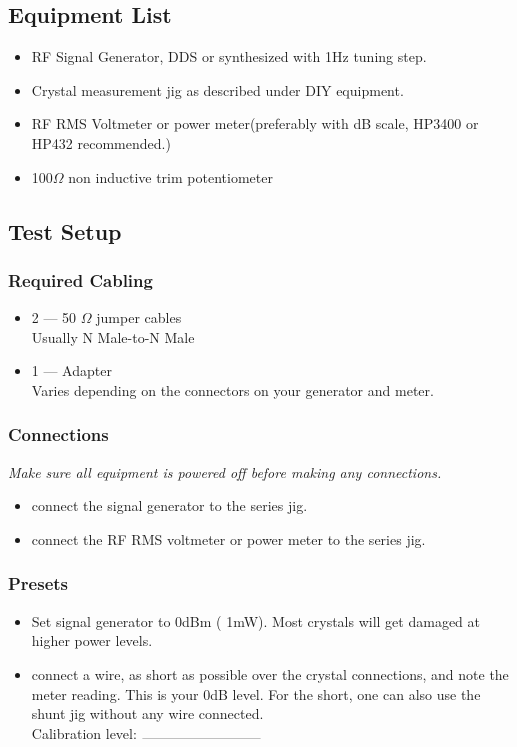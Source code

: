 \documentclass[10pt,letterpaper]{book}
\begin{document}
\subsection*{Equipment List}
\begin{itemize}
	\item RF Signal Generator, DDS or synthesized with 1Hz tuning step.
	\item Crystal measurement jig as described under DIY equipment.
	\item RF RMS Voltmeter or power meter(preferably with dB scale, HP3400 or HP432 recommended.) 
	\item 100$\Omega$ non inductive trim potentiometer
\end{itemize}

\subsection*{Test Setup}
\subsubsection*{Required Cabling}
\begin{itemize}
	\item 2 --- 50 $\Omega$ jumper cables \\
		Usually N Male-to-N Male
	\item 1 --- Adapter \\
		Varies depending on the connectors on your generator and meter.
\end{itemize}
\subsubsection*{Connections}
\emph{Make sure all equipment is powered off before making any connections.}
\begin{itemize}
\item connect the signal generator to the series jig.
\item connect the RF RMS voltmeter or power meter to the series jig.
\end{itemize}
\subsubsection*{Presets}
\begin{itemize}
\item Set signal generator to 0dBm ( 1mW). Most crystals will get damaged at higher power levels.
\item connect a wire, as short as possible over the crystal connections, and note the meter reading. This is your 0dB level. For the short, one can also use the shunt jig without any wire connected.
	\vspace{30pt}
	 \\Calibration level: $\rule{3cm}{0.1mm}$ 
\end{itemize}
\end{document}
